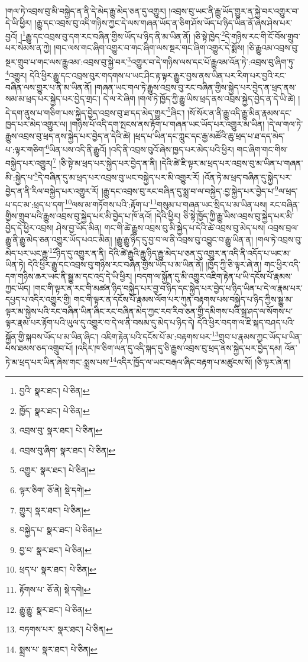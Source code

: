 །གལ་ཏེ་འབྲས་བུ་མི་བསྐྱེད་ན་ནི་དེ་མེད་རྒྱུ་མེད་ཅན་དུ་འགྱུར། །འབྲས་བུ་ཡང་ནི་རྒྱུ་ཡོད་གྱུར་ན་སྐྱེ་བར་འགྱུར་བ་དེ་ཡི་ཕྱིར། །རྒྱུ་དང་འབྲས་བུ་འདི་གཉིས་ཀྱང་དེ་ལས་གཞན་ཡོད་ན་ཅིག་ཤོས་ཡོད་པ་ཉིད་ཡིན་ནོ་ཞེས་ཤེས་པར་བྱའོ། །\footnote{བྱའི་  སྣར་ཐང་།  པེ་ཅིན། }རྒྱུ་དང་འབྲས་བུ་དག་རང་བཞིན་གྱིས་ཡོད་པ་ཉིད་ནི་མ་ཡིན་ནོ། །ཅི་སྟེ་ཁྱེད་\footnote{ཁྱོད་  སྣར་ཐང་།  པེ་ཅིན། }དེ་གཉིས་རང་གི་ངོ་བོས་གྲུབ་པར་སེམས་ན་ཀྱེ། །གང་ལས་གང་ཞིག་འགྱུར་བ་གང་ཞིག་ལས་སྔར་གང་ཞིག་འགྱུར་དེ་སྨོས། །ཅི་རྒྱུའམ་འབྲས་བུ་སྔར་གྲུབ་པ་གང་ལས་རྒྱུའམ་:འབྲས་བུ་སྐྱེ་བར་\footnote{འབྲས་བུ་  སྣར་ཐང་།  པེ་ཅིན། }འགྱུར་བ་དེ་གཉིས་ལས་དང་པོ་རྒྱུའམ་འོན་ཏེ་:འབྲས་བུ་ཞིག་ཏུ་\footnote{འབྲས་བུ་ཞིག་  སྣར་ཐང་།  པེ་ཅིན། }འགྱུར། དེའི་ཕྱིར་རྒྱུ་དང་འབྲས་བུར་གདགས་པ་ཡང་ཤིང་རྟ་ལྟར་རྒྱུར་བྱས་ནས་ཡིན་པར་རིག་པར་བྱའི་རང་བཞིན་ལས་གྱུར་པ་ནི་མ་ཡིན་ནོ། །གཞན་ཡང་གལ་ཏེ་རྒྱུས་འབྲས་བུ་རང་བཞིན་གྱིས་སྐྱེད་པར་བྱེད་ན་ཕྲད་ནས་སམ་མ་ཕྲད་པར་སྐྱེད་པར་བྱེད་གྲང་། དེ་ལ་རེ་ཞིག །གལ་ཏེ་ཁྱོད་ཀྱི་རྒྱུ་ཡིས་ཕྲད་ནས་འབྲས་སྐྱེད་བྱེད་ན་དེ་ཡི་ཚེ། །དེ་དག་ནུས་པ་གཅིག་པས་སྐྱེད་བྱེད་འབྲས་བུ་ཐ་དད་མེད་གྱུར་\footnote{འགྱུར་  སྣར་ཐང་།  པེ་ཅིན། }ཞིང་། །སོ་སོར་ན་ནི་རྒྱུ་འདི་རྒྱུ་མིན་རྣམས་དང་ཁྱད་པར་མེད་འགྱུར་ལ། །གཉིས་པོ་འདི་དག་སྤངས་ནས་རྟོག་པ་གཞན་ཡང་ཡོད་པར་འགྱུར་མ་ཡིན། །དེ་ལ་གལ་ཏེ་རྒྱུས་འབྲས་བུ་ཕྲད་ནས་སྐྱེད་པར་བྱེད་ན་དེའི་ཚེ། །ཕྲད་པ་ཡིན་དང་ཀླུང་དང་རྒྱ་མཚོའི་ཆུ་ཕྲད་པ་ཐ་དད་མེད་པ་:ལྟར་གཅིག་\footnote{ལྟར་ཅིག་  ཅོ་ནེ།  སྡེ་དགེ། }ཡིན་པས་འདི་ནི་རྒྱུའོ། །འདི་ནི་འབྲས་བུའོ་ཞེས་ཁྱད་པར་མེད་པའི་ཕྱིར། གང་ཞིག་གང་གིས་བསྐྱེད་པར་འགྱུར།\footnote{གྱུར།  སྣར་ཐང་།  པེ་ཅིན། } །ཅི་སྟེ་མ་ཕྲད་པར་སྐྱེད་པར་བྱེད་ན་ནི། །དེའི་ཚེ་ཇི་ལྟར་མ་ཕྲད་པར་འབྲས་བུ་མ་ཡིན་པ་གཞན་མི་:སྐྱེད་པ་\footnote{བསྐྱེད་པ་  སྣར་ཐང་།  པེ་ཅིན། }དེ་བཞིན་དུ་མ་ཕྲད་པར་འབྲས་བུ་ཡང་བསྐྱེད་པར་མི་འགྱུར་རོ། །འོན་ཏེ་མ་ཕྲད་བཞིན་དུ་སྐྱེད་པར་བྱེད་ན་ནི་རིལ་བསྐྱེད་པར་འགྱུར་རོ། །རྒྱུ་དང་འབྲས་བུ་རང་བཞིན་དུ་སྨྲ་བ་ལ་བསྐྱེད་:བྱ་སྐྱེད་པར་བྱེད་པ་\footnote{བྱ་བ་  སྣར་ཐང་།  པེ་ཅིན། }ལ་ཕྲད་པ་དང་མ་:ཕྲད་པ་དག་\footnote{ཕྲད་པ་  སྣར་ཐང་།  པེ་ཅིན། }ལས་མ་གཏོགས་པའི་:རྟོག་པ་\footnote{རྟོགས་པ་  ཅོ་ནེ།  སྡེ་དགེ། }གསུམ་པ་གཞན་ཡང་སྲིད་པ་མ་ཡིན་པས། རང་བཞིན་གྱིས་གྲུབ་པའི་རྒྱུས་འབྲས་བུ་སྐྱེད་པར་མི་བྱེད་པ་ཁོ་ནའོ། །དེའི་ཕྱིར། ཅི་སྟེ་ཁྱོད་ཀྱི་རྒྱུ་ཡིས་འབྲས་བུ་སྐྱེད་པར་མི་བྱེད་དེ་ཕྱིར་འབྲས། ཤེས་བྱ་ཡོད་མིན། གང་གི་ཚེ་རྒྱུས་འབྲས་བུ་མི་སྐྱེད་པ་དེའི་ཚེ་འབྲས་བུ་མེད་པས། འབྲས་བྲལ་རྒྱུ་ནི་རྒྱུ་མེད་ཅན་འགྱུར་ཡོད་པའང་མིན། །རྒྱུ་རྒྱུ་ཉིད་དུ་བྱ་བ་ལ་ནི་འབྲས་བུ་འབྱུང་བ་རྒྱུ་ཡིན་ན། །གལ་ཏེ་འབྲས་བུ་མེད་པར་ཡང་རྒྱུ་\footnote{རྒྱུ་རྒྱུ་  སྣར་ཐང་།  པེ་ཅིན། }ཉིད་དུ་འགྱུར་ན་ནི། དེའི་ཚེ་རྒྱུའི་རྒྱུ་ཉིད་རྒྱུ་མེད་པ་ཅན་དུ་འགྱུར་ན་འདི་ནི་འདོད་པ་ཡང་མ་ཡིན་ཏེ། དེའི་ཕྱིར་རྒྱུ་དང་འབྲས་བུ་གཉིས་རང་བཞིན་གྱིས་ཡོད་པ་མ་ཡིན་ནོ། །ཁྱོད་ཀྱི་ཅི་ལྟར་ཞེ་ན། གང་ཕྱིར་འདི་དག་གཉིས་ཆར་ཡང་ནི་སྒྱུ་མ་དང་འདྲ་དེ་ཡི་ཕྱིར། །བདག་ལ་སྐྱོན་དུ་མི་འགྱུར་འཇིག་རྟེན་པ་ཡི་དངོས་པོ་རྣམས་ཀྱང་ཡོད། །གང་གི་ལྟར་ན་རང་གི་མཚན་ཉིད་བསྐྱེད་པར་བྱ་བ་ཉིད་དང་སྐྱེད་པར་བྱེད་པ་ཉིད་ཡིན་པ་དེ་ལ་རྣམ་པར་དཔྱད་པ་འདིར་འགྱུར་གྱི། གང་གི་ལྟར་ན་དངོས་པོ་རྣམས་ལོག་པར་ཀུན་བརྟགས་པས་བསྐྱེད་པ་ཉིད་ཀྱིས་སྒྱུ་མ་ལྟར་མ་སྐྱེས་པའི་རང་བཞིན་ཡིན་ཞིང་རང་བཞིན་མེད་ཀྱང་རབ་རིབ་ཅན་གྱི་དམིགས་པའི་སྐྲ་ཤད་ལ་སོགས་པ་ལྟར་རྣམ་པར་རྟོག་པའི་ཡུལ་དུ་འགྱུར་བ་དེ་ལ་ནི་བསམ་དུ་མེད་པ་ཉིད་དེ། དེའི་ཕྱིར་བདག་ལ་ཇི་སྐད་བཤད་པའི་སྐྱོན་གྱི་སྐབས་ཡོད་པ་མ་ཡིན་ཞིང་། འཇིག་རྟེན་པའི་དངོས་པོ་མ་:བརྟགས་པར་\footnote{བཏགས་པར་  སྣར་ཐང་།  པེ་ཅིན། }གྲུབ་པ་རྣམས་ཀྱང་ཡོད་པ་ཡིན་པས་ཐམས་ཅད་འགྲུབ་པོ། །འདིར་ཁ་ཅིག་ལན་དུ་འདི་སྐད་དུ་ཅི་རྒྱུས་འབྲས་བུ་ཕྲད་ནས་སྐྱེད་པར་བྱེད་དམ། འོན་ཏེ་མ་ཕྲད་པར་ཡིན་ཞེས་གང་:སྨྲས་པས་\footnote{སྨྲས་པ་  སྣར་ཐང་།  པེ་ཅིན། }འདིར་ཁྱོད་ལ་ཡང་བརྒལ་ཞིང་བརྟག་པ་མཚུངས་སོ། །ཅི་ལྟར་ཞེ་ན། 